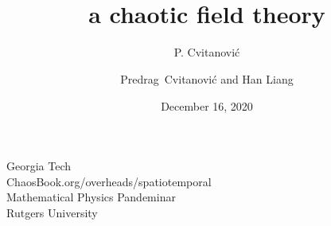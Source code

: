 


                        \newif\ifboyscout\boyscouttrue          %
                        \newif\ifsubmission\submissionfalse     %
                        \newif\ifblog\blogfalse %


\usepackage[font=scriptsize, labelfont=bf]{caption}
\usepackage[
    backend=biber,  %
    sorting=nyt,
    style=numeric, %
    natbib=true,
    style=phys, %
    biblabel= brackets, %
    articletitle=false, %
    pageranges = true , %
    sortlocale=en_US,
    firstinits=true,
    url=false, %
    doi=false, %
    eprint=false
]{biblatex}



\renewcommand{\Ssym}[1]{{\ensuremath{m_{#1}}}}    %


\title{
{\huge \catlatt}
    \\
{a chaotic field theory}
}
\author{P. Cvitanovi\'c}
\author[Cvitanovi\'c]
{
  \textcolor{green!50!black}{
  {Predrag~Cvitanovi\'c
    and
    Han Liang
  }	%
  }
}
\institute
{
                    {\large Georgia Tech}
\\
 {ChaosBook.org/overheads/spatiotemporal}
 \\ \bigskip
             Mathematical Physics Pandeminar\\
                Rutgers University
 }
\date{December 16, 2020}

